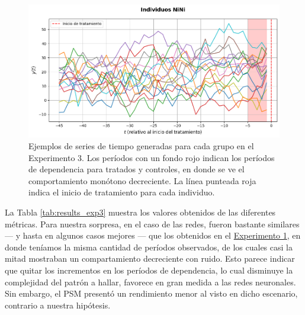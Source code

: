\documentclass[../../main.tex]{subfiles}
\begin{document}
\begin{figure}[ht]
    \begin{minipage}{0.6\textwidth}
        \centering
        \includegraphics[scale=0.27]{figs/Exp3/ninis_sim63.png}
    \end{minipage}
    \caption{Ejemplos de series de tiempo generadas para cada grupo en el Experimento 3.
    Los períodos con un fondo rojo indican los períodos de dependencia para tratados y
    controles, en donde se ve el comportamiento monótono decreciente. La línea
    punteada roja indica el inicio de tratamiento para cada individuo.}
    \label{fig:time_series_exp3}
\end{figure}

La Tabla \ref{tab:results_exp3} muestra los valores obtenidos de las diferentes métricas.
Para nuestra sorpresa, en el caso de las redes, fueron bastante similares — y hasta en
algunos casos mejores — que los obtenidos en el \hyperref[sec:exp1]{Experimento 1}, en
donde teníamos la misma cantidad de períodos observados, de los cuales casi la mitad
mostraban un compartamiento decreciente con ruido. Esto parece indicar que quitar los
incrementos en los períodos de dependencia, lo cual disminuye la complejidad del patrón a
hallar, favorece en gran medida a las redes neuronales. Sin embargo, el PSM presentó un
rendimiento menor al visto en dicho escenario, contrario a nuestra hipótesis.
\end{document}
